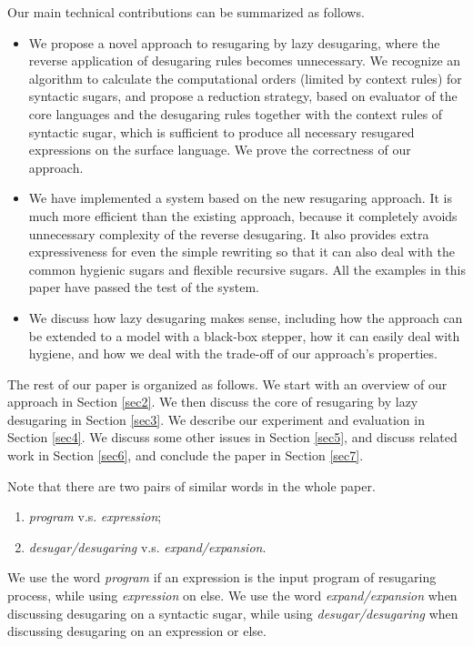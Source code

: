 Our main technical contributions can be summarized as follows.
\begin{itemize}
\item We propose a novel approach to resugaring by lazy desugaring, where the reverse application of desugaring rules becomes unnecessary. We recognize an algorithm to calculate the computational orders (limited by context rules) for syntactic sugars, and propose a reduction strategy, based on evaluator of the core languages and the desugaring rules together with the context rules of syntactic sugar, which is sufficient to produce all necessary resugared expressions on the surface language. We prove the correctness of our approach.

\item We have implemented a system based on the new resugaring approach. It is much more efficient than the existing approach, because it completely avoids unnecessary complexity of the reverse desugaring. It also provides extra expressiveness for even the simple rewriting so that it can also deal with the common hygienic sugars and flexible recursive sugars. All the examples in this paper have passed the test of the system. 

\item We discuss how lazy desugaring makes sense, including how the approach can be extended to a model with a black-box stepper, how it can easily deal with hygiene, and how we deal with the trade-off of our approach's properties.


\end{itemize}

The rest of our paper is organized as follows. We start with an overview of our approach in Section \ref{sec2}. We then discuss the core of resugaring by lazy desugaring in Section \ref{sec3}. We describe our experiment and evaluation in Section \ref{sec4}. We discuss  some other issues in Section \ref{sec5}, and discuss related work in Section \ref{sec6}, and conclude the paper in Section \ref{sec7}.

Note that there are two pairs of similar words in the whole paper.
\begin{enumerate}
	\item \emph{program} v.s. \emph{expression};
	\item \emph{desugar/desugaring} v.s. \emph{expand/expansion}.
\end{enumerate}  
We use the word \emph{program} if an expression is the input program of resugaring process, while using \emph{expression} on else. We use the word \emph{expand/expansion} when discussing desugaring on a syntactic sugar, while using \emph{desugar/desugaring} when discussing desugaring on an expression or else.
